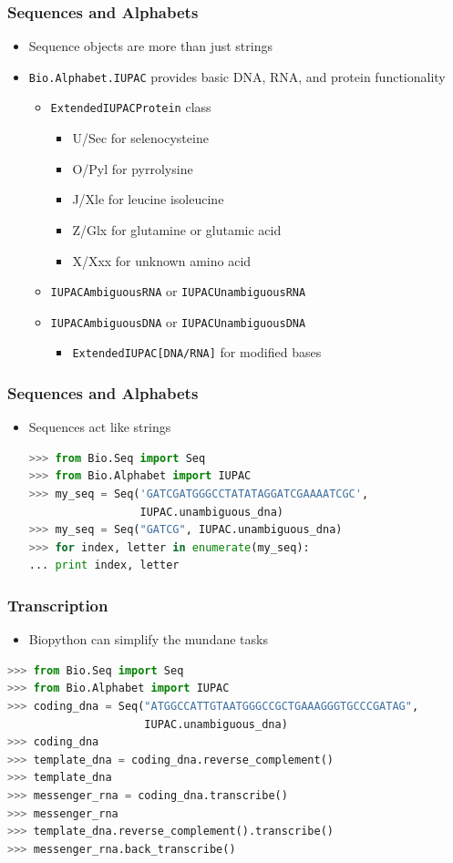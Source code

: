 \documentclass[xcolor=table,10pt,final]{beamer}
\begin{document}
\begin{frame}[fragile]
	\frametitle{Sequences and Alphabets}
	\begin{itemize}
		\item Sequence objects are more than just strings
		\item \texttt{Bio.Alphabet.IUPAC} provides basic DNA, RNA, and protein 			      functionality
		\begin{itemize}
			\item \texttt{ExtendedIUPACProtein} class
			\begin{itemize}
				\item U/Sec for selenocysteine
				\item O/Pyl for pyrrolysine
				\item J/Xle for leucine isoleucine
				\item Z/Glx for glutamine or glutamic acid
				\item X/Xxx for unknown amino acid
			\end{itemize}
			\item \texttt{IUPACAmbiguousRNA} or \texttt{IUPACUnambiguousRNA}
			\item \texttt{IUPACAmbiguousDNA} or \texttt{IUPACUnambiguousDNA}
			\begin{itemize}
				\item \texttt{ExtendedIUPAC[DNA/RNA]} for modified bases
			\end{itemize}
		\end{itemize}
	\end{itemize}
\end{frame}


\begin{frame}[fragile]
	\frametitle{Sequences and Alphabets}
	\begin{itemize}
		\item Sequences act like strings
			\begin{lstlisting}[language=python]
>>> from Bio.Seq import Seq
>>> from Bio.Alphabet import IUPAC
>>> my_seq = Seq('GATCGATGGGCCTATATAGGATCGAAAATCGC',
                 IUPAC.unambiguous_dna)
>>> my_seq = Seq("GATCG", IUPAC.unambiguous_dna)
>>> for index, letter in enumerate(my_seq):
... print index, letter
			\end{lstlisting}
	\end{itemize}
\end{frame}


\begin{frame}[fragile]
	\frametitle{Transcription}
		\begin{itemize}
			\item Biopython can simplify the mundane tasks
		\end{itemize}
		\begin{lstlisting}[language=python]
>>> from Bio.Seq import Seq
>>> from Bio.Alphabet import IUPAC
>>> coding_dna = Seq("ATGGCCATTGTAATGGGCCGCTGAAAGGGTGCCCGATAG",
                     IUPAC.unambiguous_dna)
>>> coding_dna
>>> template_dna = coding_dna.reverse_complement()
>>> template_dna
>>> messenger_rna = coding_dna.transcribe()
>>> messenger_rna
>>> template_dna.reverse_complement().transcribe()
>>> messenger_rna.back_transcribe()
		\end{lstlisting}
\end{frame}
\end{document}
